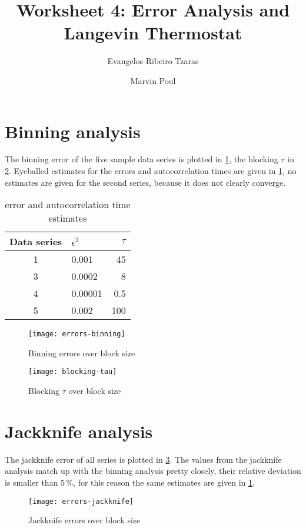 \documentclass[a4paper,11pt,bibtotoc]{scrartcl}
\title{Worksheet 4: Error Analysis and Langevin Thermostat}
\author{Evangelos Ribeiro Tzaras \and Marvin Poul}
\begin{document}
\maketitle

\section{Binning analysis}

The binning error of the five sample data series is plotted in
\cref{fig:error-binning}, the blocking $\tau$ in \cref{fig:blocking-tau}.
Eyeballed estimates for the errors and autocorrelation times are given in
\cref{tab:eyeball}, no estimates are given for the second series, because it
does not clearly converge.

\begin{table}
    \centering
    \caption{error and autocorrelation time estimates}
    \label{tab:eyeball}
    \begin{tabular}{clr}
        \toprule
        Data series & $\epsilon^2$ & $\tau$ \\
        \midrule
        1 & 0.001 & 45 \\
        3 & 0.0002 & 8  \\
        4 & 0.00001 & 0.5 \\
        5 & 0.002 & 100 \\
        \bottomrule
    \end{tabular}
\end{table}

\begin{figure}[htb]
    \centering
    \texttt{[image: errors-binning]}
    \caption{Binning errors over block size}
    \label{fig:error-binning}
\end{figure}

\begin{figure}[htb]
    \centering
    \texttt{[image: blocking-tau]}
    \caption{Blocking $\tau$ over block size}
    \label{fig:blocking-tau}
\end{figure}

\section{Jackknife analysis}

The jackknife error of all series is plotted in \cref{fig:error-jackknife}. The
values from the jackknife analysis match up with the binning analysis pretty
closely, their relative deviation is smaller than $5\,\%$, for this reason the
same estimates are given in \cref{tab:eyeball}.

\begin{figure}[htb]
    \centering
    \texttt{[image: errors-jackknife]}
    \caption{Jackknife errors over block size}
    \label{fig:error-jackknife}
\end{figure}
\end{document}
